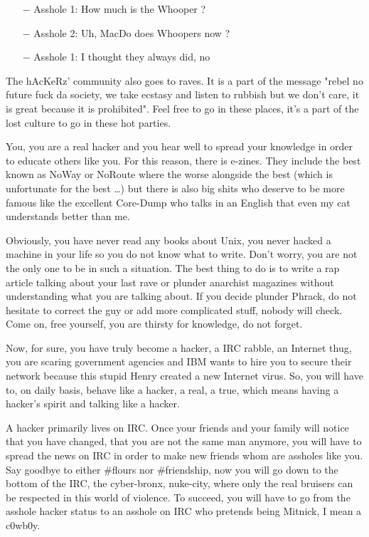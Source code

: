 \begin{itemize}
	\item[$-$] Asshole 1: How much is the Whooper ?
	\item[$-$] Asshole 2: Uh, MacDo does Whoopers now ?
	\item[$-$] Asshole 1: I thought they always did, no 
\end{itemize}

The hAcKeRz' community also goes to raves. It is a part of the message "rebel no future fuck da society, we take ecstasy and listen to rubbish but we don't care, it is great because it is prohibited". Feel free to go in these places, it's a part of the lost culture to go in these hot parties.

You, you are a real hacker and you hear well to spread your knowledge in order to educate others like you. For this reason, there is e-zines. They include the best known as NoWay or NoRoute where the worse alongside the best (which is unfortunate for the best …) but there is also big shits who deserve to be more famous like the excellent Core-Dump who talks in an English that even my cat understands better than me.

Obviously, you have never read any books about Unix, you never hacked a machine in your life so you do not know what to write. Don't worry, you are not the only one to be in such a situation. The best thing to do is to write a rap article talking about your last rave or plunder anarchist magazines without understanding what you are talking about. If you decide plunder Phrack, do not hesitate to correct the guy or add more complicated stuff, nobody will check. Come on, free yourself, you are thirsty for knowledge, do not forget.

Now, for sure, you have truly become a hacker, a IRC rabble, an Internet thug, you are scaring government agencies and IBM wants to hire you to secure their network because this stupid Henry created a new Internet virus. So, you will have to, on daily basis, behave like a hacker, a real, a true, which means having a hacker's spirit and talking like a hacker.

A hacker primarily lives on IRC. Once your friends and your family will notice that you have changed, that you are not the same man anymore, you will have to spread the news on IRC in order to make new friends whom are assholes like you. Say goodbye to either \#flours nor \#friendship, now you will go down to the bottom of the IRC, the cyber-bronx, nuke-city, where only the real bruisers can be respected in this world of violence. To succeed, you will have to go from the asshole hacker status to an asshole on IRC who pretends being Mitnick, I mean a c0wb0y.
\begin{center}\underline{\hspace{5 cm}}\end{center}	

